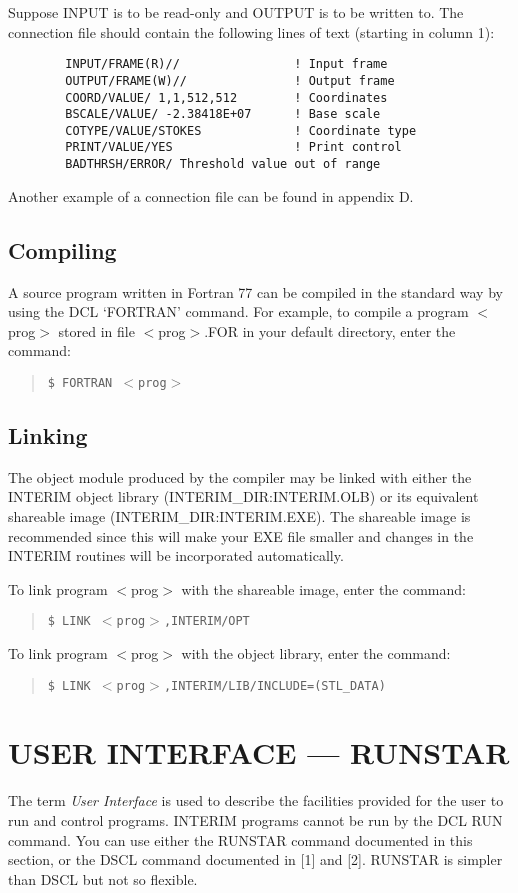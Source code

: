 Suppose INPUT is to be read-only and OUTPUT is to be written to.
The connection file should contain the following lines of text (starting in
column 1):
\begin{verbatim}
        INPUT/FRAME(R)//                ! Input frame
        OUTPUT/FRAME(W)//               ! Output frame
        COORD/VALUE/ 1,1,512,512        ! Coordinates
        BSCALE/VALUE/ -2.38418E+07      ! Base scale
        COTYPE/VALUE/STOKES             ! Coordinate type
        PRINT/VALUE/YES                 ! Print control
        BADTHRSH/ERROR/ Threshold value out of range
\end{verbatim}
Another example of a connection file can be found in appendix D.
\subsection {Compiling}
A source program written in Fortran 77 can be compiled in the standard way by
using the DCL `FORTRAN' command.
For example, to compile a program $<$prog$>$ stored in file $<$prog$>$.FOR in your
default directory, enter the command:
\begin{quote}
{\tt \$ FORTRAN $<$prog$>$}
\end{quote}
\subsection {Linking}
The object module produced by the compiler may be linked with either the
INTERIM object library (INTERIM\_DIR:INTERIM.OLB) or its equivalent shareable
image (INTERIM\_DIR:INTERIM.EXE).
The shareable image is recommended since this will make your EXE file smaller
and changes in the INTERIM routines will be incorporated automatically.

To link program $<$prog$>$ with the shareable image, enter the command:
\begin{quote}
{\tt \$ LINK $<$prog$>$,INTERIM/OPT}
\end{quote}
To link program $<$prog$>$ with the object library, enter the command:
\begin{quote}
{\tt \$ LINK $<$prog$>$,INTERIM/LIB/INCLUDE=(STL\_DATA)}
\end{quote}
\section {USER INTERFACE --- RUNSTAR}
The term {\em User Interface} is used to describe the facilities provided for
the user to run and control programs.
INTERIM programs cannot be run by the DCL RUN command.
You can use either the RUNSTAR command documented in this section, or the DSCL
command documented in [1] and [2].
RUNSTAR is simpler than DSCL but not so flexible.
